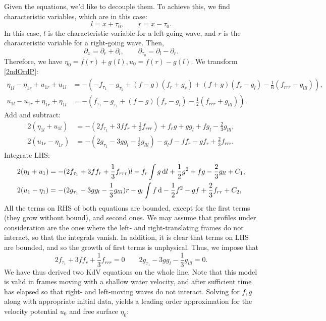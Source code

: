 \documentclass[10pt,reqno,oneside,a4paper]{article}
\begin{document}
Given the equations, we'd like to decouple them. To achieve this, we find characteristic variables, which are in this case:
\begin{equation}\label{CharVars}
l = x + \tau_0, \qquad r= x - \tau_0.
\end{equation}
In this case, $l$ is the characteristic variable for a left-going wave, and $r$ is the characteristic variable for a right-going wave. Then, 
\[ 
\partial_x = \partial_r + \partial_l, \qquad \partial_{\tau_0} = \partial_l - \partial_r.
\]
Therefore, we have $\eta_0 = f(r) + g(l), u_0 = f(r)- g(l).$ We transform \eqref{2ndOrdP}:
\begin{align*}
\eta_{1l} - \eta_{1r} + u_{1r} + u_{1l} &= - (-f_{\tau_1} - g_{\tau_1} + (f-g)(f_r + g_r) + (f + g)(f_r- g_l) - \frac{1}{6}(f_{rrr}-g_{lll})), \\
u_{1l} - u_{1r} + \eta_{1r} + \eta_{1l} &= - (f_{\tau_1} - g_{\tau_1} + (f-g)(f_r - g_l) - \frac{1}{2}(f_{rrr}+g_{lll})).
\end{align*}
Add and subtract:
\begin{align*}
2(\eta_{1l} + u_{1l}) &= - (2f_{\tau_1}+ 3ff_r + \frac{1}{3}f_{rrr}) +f_r g +g g_l + fg_l - \frac{2}{3}g_{lll}, \\
2(u_{1r} - \eta_{1r}) &= - (2g_{\tau_1} - 3gg_l - \frac{1}{3}g_{lll}) - g_l f- f f_r - g f_r + \frac{2}{3}f_{rrr}. 
\end{align*}
Integrate LHS:
\begin{align*}
2(\eta_{1} + u_{1}) &= - (2f_{\tau_1}+ 3ff_r + \frac{1}{3}f_{rrr})l +f_r \int g \,\mathrm{d} l +\frac{1}{2}g^2 + fg - \frac{2}{3}g_{ll} + C_1, \\
2(u_{1} - \eta_{1}) &= - (2g_{\tau_1} - 3gg_l - \frac{1}{3}g_{lll})r - g_l \int f \,\mathrm{d} - \frac{1}{2}f^2 - g f + \frac{2}{3}f_{rr} + C_2,
\end{align*}
All the terms on RHS of both equations are bounded, except for the first terms (they grow without bound), and second ones. We may assume that profiles under consideration are the ones where the left- and right-translating frames do not interact, so that the integrals vanish. In addition, it is clear that terms on LHS are bounded, and so the growth of first terms is unphysical. Thus, we impose that 
\[ 
2f_{\tau_1}+ 3ff_r + \frac{1}{3}f_{rrr} = 0 \qquad 2g_{\tau_1} - 3gg_l - \frac{1}{3}g_{lll} = 0.
\]
We have thus derived two KdV equations on the whole line. Note that this model is valid in frames moving with a shallow water velocity, and after sufficient time has elapsed so that right- and left-moving waves do not interact. Solving for $f, g$ along with appropriate initial data, yields a leading order approximation for the velocity potential $u_0$ and free surface $\eta_0:$
\end{document}
